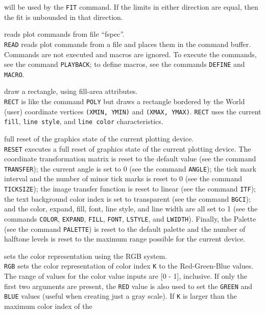 	will be used by the {\tt FIT} command.
	If the limits in either direction are equal, then the fit is
	unbounded in that direction.
\item [{\tt READ fspec } --] reads plot commands from file ``fspec''.\\
	{\tt READ} reads plot commands from a file and places
	them in the command buffer.  Commands are not executed and macros
	are ignored.  To execute the commands, see the command
	{\tt PLAYBACK}; to define macros,
	see the commands {\tt DEFINE} and
	{\tt MACRO}.
\item [{\tt RECT xmin xmax ymin ymax } --] draw a rectangle, using fill-area attributes.\\
	{\tt RECT} is like the command
	{\tt POLY} but draws a
	rectangle bordered by the World (user) coordinate vertices
	{\tt (XMIN, YMIN)} and {\tt (XMAX, YMAX)}.
	{\tt RECT} uses the current
	{\tt fill}, {\tt line style}, and
	{\tt line color} characteristics.
\item [{\tt RESET } --] full reset of the graphics state of the current plotting device.\\
	{\tt RESET} executes a full reset of graphics state of the
	current plotting device.  The coordinate transformation matrix is
	reset to the default value (see the command
	{\tt TRANSFER}); the current
	angle is set to 0 (see the command
	{\tt ANGLE}); the
	tick mark interval and the number of minor tick marks is reset to 0
	(see the command {\tt TICKSIZE}); the
	image transfer function is reset to linear (see the command
	{\tt ITF}); the text background color index
	is set to transparent (see the command
	{\tt BGCI}); and the
	color, expand, fill, font, line style, and line width are all set
	to 1 (see the commands {\tt COLOR},
	{\tt EXPAND},
	{\tt FILL},
	{\tt FONT},
	{\tt LSTYLE}, and
	{\tt LWIDTH}).  Finally, the Palette
	(see the command {\tt PALETTE}) is
	reset to the default palette and the number of halftone levels is
	reset to the maximum range possible for the current device.
\item [{\tt RGB K red [green blue] } --] sets the color representation using the RGB system.\\
	{\tt RGB} sets the color representation of color index
	{\tt K} to the Red-Green-Blue values.  The range of values
	for the color value inputs are [0 - 1], inclusive.  If only the
	first two arguments are present, the {\tt RED} value is
	also used to set the {\tt GREEN} and {\tt BLUE} values
	(useful when creating just a gray scale).
	If {\tt K} is larger than the maximum color index of the
